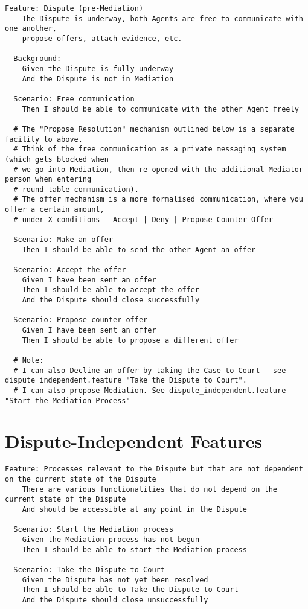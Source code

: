 \begin{lstlisting}
Feature: Dispute (pre-Mediation)
    The Dispute is underway, both Agents are free to communicate with one another,
    propose offers, attach evidence, etc.
  
  Background:
    Given the Dispute is fully underway
    And the Dispute is not in Mediation

  Scenario: Free communication
    Then I should be able to communicate with the other Agent freely

  # The "Propose Resolution" mechanism outlined below is a separate facility to above.
  # Think of the free communication as a private messaging system (which gets blocked when
  # we go into Mediation, then re-opened with the additional Mediator person when entering
  # round-table communication).
  # The offer mechanism is a more formalised communication, where you offer a certain amount,
  # under X conditions - Accept | Deny | Propose Counter Offer

  Scenario: Make an offer
    Then I should be able to send the other Agent an offer

  Scenario: Accept the offer
    Given I have been sent an offer
    Then I should be able to accept the offer
    And the Dispute should close successfully

  Scenario: Propose counter-offer
    Given I have been sent an offer
    Then I should be able to propose a different offer

  # Note:
  # I can also Decline an offer by taking the Case to Court - see dispute_independent.feature "Take the Dispute to Court".
  # I can also propose Mediation. See dispute_independent.feature "Start the Mediation Process"
\end{lstlisting}

\section{Dispute-Independent Features}

\begin{lstlisting}
Feature: Processes relevant to the Dispute but that are not dependent on the current state of the Dispute
    There are various functionalities that do not depend on the current state of the Dispute
    And should be accessible at any point in the Dispute

  Scenario: Start the Mediation process
    Given the Mediation process has not begun
    Then I should be able to start the Mediation process

  Scenario: Take the Dispute to Court
    Given the Dispute has not yet been resolved
    Then I should be able to Take the Dispute to Court
    And the Dispute should close unsuccessfully
\end{lstlisting}

